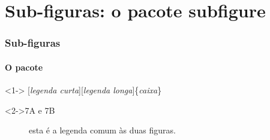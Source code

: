 \documentclass[handout,10pt]{beamer}
\begin{document}
\section{Sub-figuras: o pacote subfigure}
\begin{frame}[fragile]
	\frametitle{Sub-figuras}
	\framesubtitle{O pacote }
	
	\begin{block}<1->{}
		\centering
		[\textit{legenda curta}][\textit{legenda longa}]\{\textit{caixa}\}
	\end{block}
	
	\begin{atividade}<2->{7A e 7B}
		\small
		\begin{LaTeXcode}
			\begin{figure}[tb]
			  \hfill
			  \hfill
			  \hspace*{\fill} %
			
			  \caption{esta é a legenda comum às duas figuras.}
			  \label{fig:figAeB}
			\end{figure}
		\end{LaTeXcode}
	\end{atividade}
	
\end{frame}
\end{document}
